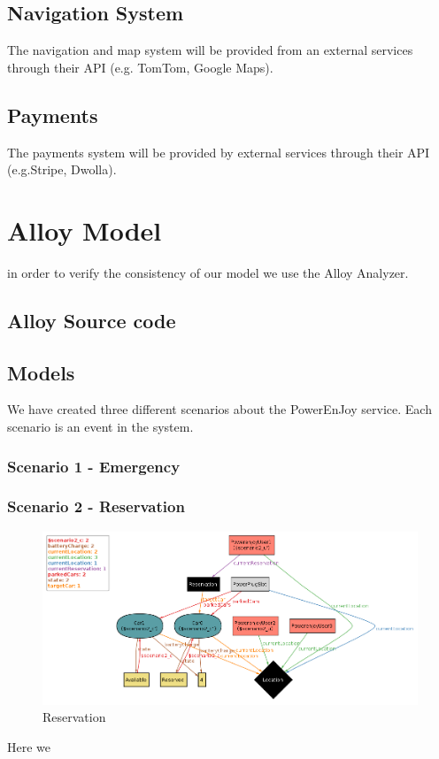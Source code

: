 \documentclass[english]{article}
\begin{document}
\subsection{Navigation System}
	The navigation and map system will be provided from an external services through their API (e.g. TomTom, Google Maps).
\subsection{Payments}
	The payments system will be provided by external services through their API (e.g.Stripe, Dwolla).

\section{Alloy Model}
	in order to verify the consistency of our model we use the Alloy Analyzer.
	\subsection{Alloy Source code}
	
	\subsection{Models}
		We have created three different scenarios about the PowerEnJoy service. Each scenario is an event in the system.
		\subsubsection{Scenario 1 - Emergency}
			
		\subsubsection{Scenario 2 - Reservation}
			\begin{figure}[H]
				\centering
				\includegraphics[scale=0.8]{Scenario2_OK.png}%
				\caption{Reservation}
			\end{figure}
		Here we 
\end{document}
